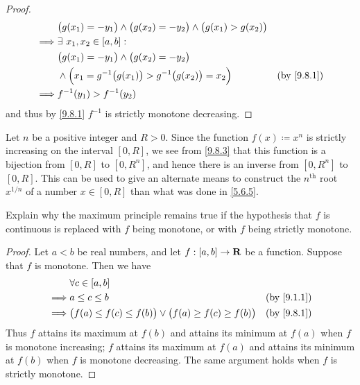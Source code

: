 \begin{proof}
\begin{align*}
             & \big(g(x_1) = -y_1\big) \land \big(g(x_2) = -y_2\big) \land \big(g(x_1) > g(x_2)\big)                              \\
    \implies & \exists\ x_1, x_2 \in [a, b] :                                                                                     \\
             & \big(g(x_1) = -y_1\big) \land \big(g(x_2) = -y_2\big)                                                              \\
             & \land \Big(x_1 = g^{-1}\big(g(x_1)\big) > g^{-1}\big(g(x_2)\big) = x_2\Big)             & \text{(by \cref{9.8.1})} \\
    \implies & f^{-1}(y_1) > f^{-1}(y_2)
  \end{align*}
  and thus by \cref{9.8.1} \(f^{-1}\) is strictly monotone decreasing.
\end{proof}

\begin{example}\label{9.8.4}
  Let \(n\) be a positive integer and \(R > 0\).
  Since the function \(f(x) \coloneqq x^n\) is strictly increasing on the interval \([0, R]\), we see from \cref{9.8.3} that this function is a bijection from \([0, R]\) to \([0, R^n]\), and hence there is an inverse from \([0, R^n]\) to \([0, R]\).
  This can be used to give an alternate means to construct the \(n^\text{th}\) root \(x^{1 / n}\) of a number \(x \in [0, R]\) than what was done in \cref{5.6.5}.
\end{example}

\exercisesection

\begin{exercise}\label{ex 9.8.1}
  Explain why the maximum principle remains true if the hypothesis that \(f\) is continuous is replaced with \(f\) being monotone, or with \(f\) being strictly monotone.
\end{exercise}

\begin{proof}
  Let \(a < b\) be real numbers, and let \(f : [a, b] \to \mathbf{R}\) be a function.
  Suppose that \(f\) is monotone.
  Then we have
  \begin{align*}
             & \forall c \in [a, b]                                                                                  \\
    \implies & a \leq c \leq b                                                            & \text{(by \cref{9.1.1})} \\
    \implies & \big(f(a) \leq f(c) \leq f(b)\big) \lor \big(f(a) \geq f(c) \geq f(b)\big) & \text{(by \cref{9.8.1})} \\
  \end{align*}
  Thus \(f\) attains its maximum at \(f(b)\) and attains its minimum at \(f(a)\) when \(f\) is monotone increasing;
  \(f\) attains its maximum at \(f(a)\) and attains its minimum at \(f(b)\) when \(f\) is monotone decreasing.
  The same argument holds when \(f\) is strictly monotone.
\end{proof}

